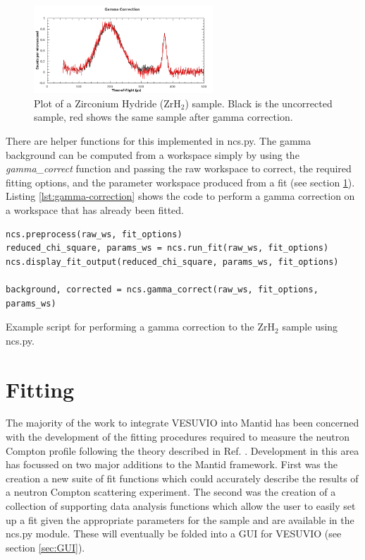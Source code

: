 \documentclass[paper=a4, fontsize=11pt]{scrartcl}	%
\numberwithin{equation}{section}															%
\numberwithin{figure}{section}																%
\numberwithin{table}{section}
\begin{document}
\begin{figure}[H]
\centering
\includegraphics[width=0.6\textwidth]{img/corrections-gamma.png}
\caption{Plot of a Zirconium Hydride (ZrH$_2$) sample. Black is the uncorrected sample, red shows the same sample after gamma correction.}
\label{fig:corrections-gamma}
\end{figure}

There are helper functions for this implemented in ncs.py. The gamma background can be computed from a workspace simply by using the \textit{gamma\_correct} function and passing the raw workspace to correct, the required fitting options, and the parameter workspace produced from a fit (see section \ref{sec:fitting}). Listing \ref{lst:gamma-correction} shows the code to perform a gamma correction on a workspace that has already been fitted.

\begin{listing}[H]
\begin{verbatim}
ncs.preprocess(raw_ws, fit_options)
reduced_chi_square, params_ws = ncs.run_fit(raw_ws, fit_options)
ncs.display_fit_output(reduced_chi_square, params_ws, fit_options)

background, corrected = ncs.gamma_correct(raw_ws, fit_options, params_ws)
\end{verbatim}
\caption{Example script for performing a gamma correction to the ZrH$_2$ sample using ncs.py.}
\label{lst:gamma-correction}
\end{listing}

\section{Fitting}
\label{sec:fitting}
The majority of the work to integrate VESUVIO into Mantid has been concerned with the development of the fitting procedures required to measure the neutron Compton profile following the theory described in Ref. \citep{mayers2012vesuvio}. Development in this area has focussed on two major additions to the Mantid framework. First was the creation a new suite of fit functions which could accurately describe the results of a neutron Compton scattering experiment. The second was the creation of a collection of supporting data analysis functions which allow the user to easily set up a fit given the appropriate parameters for the sample and are available in the ncs.py module. These will eventually be folded into a GUI for VESUVIO (see section \ref{sec:GUI}).
\end{document}
